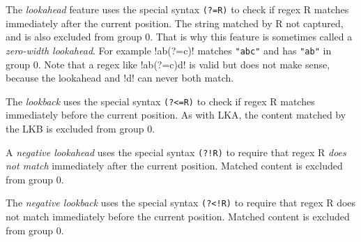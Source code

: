 \begin{description}  \itemsep -1pt
\item[LKA:] The \emph{lookahead} feature uses the special syntax \verb!(?=R)!  to check if regex R matches immediately after the current position.  The string matched by R not captured, and is also excluded from group 0.  That is why this feature is sometimes called a \emph{zero-width lookahead}.  For example \cverb!ab(?=c)! matches \verb!"abc"! and has \verb!"ab"! in group 0.  Note that a regex like \cverb!ab(?=c)d! is valid but does not make sense, because the lookahead and \cverb!d! can never both match.


\item[LKB:] The \emph{lookback} uses the special syntax \verb!(?<=R)! to check if regex R matches immediately before the current position.  As with LKA, the content matched by the LKB is excluded from group 0.

\item[NLKA:] A \emph{negative lookahead} uses the special syntax \verb|(?!R)| to require that regex R \emph{does not match} immediately after the current position.  Matched content is excluded from group 0.


\item[NLKB:] The \emph{negative lookback} uses the special syntax \verb|(?<!R)| to require that regex R does not match immediately before the current position.  Matched content is excluded from group 0.
\end{description}

